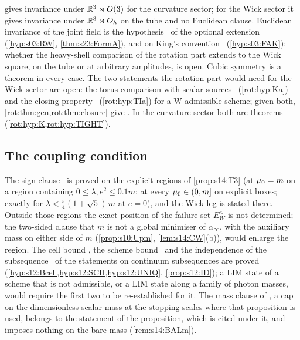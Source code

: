  gives invariance under $\mathbb R^3\rtimes O(3)$ for the curvature sector; for the Wick sector it gives invariance under $\mathbb R^3\rtimes O_h$ on the tube and no Euclidean clause. Euclidean invariance of the joint field is the hypothesis \RW\ of the optional extension (\cref{hyp:s03:RW}, \cref{thm:s23:FormA}), and on King's convention \FAK\ (\cref{hyp:s03:FAK}); whether the heavy-shell comparison of the rotation part extends to the Wick square, on the tube or at arbitrary amplitudes, is open. Cubic symmetry is a theorem in every case. The two statements the rotation part would need for the Wick sector are open: the torus comparison with scalar sources \Ka\ (\cref{rot:hyp:Ka}) and the closing property \TIa\ (\cref{rot:hyp:TIa}) for a $\mathrm W$-admissible scheme; given both, \cref{rot:thm:gen,rot:thm:closure} give \RW. In the curvature sector both are theorems (\cref{rot:hyp:K,rot:hyp:TIGHT}).

\subsection{The coupling condition}

The sign clause \Tthree\ is proved on the explicit regions of \cref{prop:s14:T3} (at $\mu_0=m$ on a region containing $0\le\lambda,e^2\le0.1m$; at every $\mu_0\in(0,m]$ on explicit boxes; exactly for $\lambda<\frac\pi4(1+\sqrt5)\,m$ at $e=0$), and the Wick leg is stated there. Outside those regions the exact position of the failure set $E^<_W$ is not determined; the two-sided clause that $m$ is not a global minimiser of $\alpha_\infty$, with the auxiliary mass on either side of $m$ (\cref{prop:s10:Upm}, \cref{lem:s14:CW}(b)), would enlarge the region. The cell bound \Bcell, the scheme bound \SCH\ and the independence of the subsequence \UNIQ\ of the statements on continuum subsequences are proved (\cref{hyp:s12:Bcell,hyp:s12:SCH,hyp:s12:UNIQ}, \cref{prop:s12:ID}); a LIM state of a scheme that is not admissible, or a LIM state along a family of photon masses, would require the first two to be re-established for it. The mass clause of \cite[Prop.~3.1]{Ba2}, a cap on the dimensionless scalar mass at the stopping scales where that proposition is used, belongs to the statement of the proposition, which is cited under it, and imposes nothing on the bare mass (\cref{rem:s14:BALm}).
